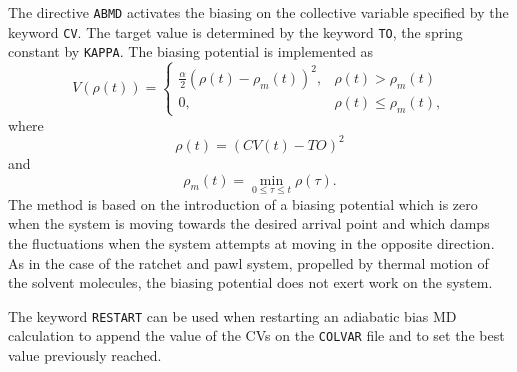 \documentclass[12pt,fleqn]{report}
\newcommand{\keyword}[1]{\index{Keywords!{\tt #1}} {\tt #1}}
\begin{document}
The directive \keyword{ABMD} activates the biasing on the collective
variable specified by the keyword {\tt CV}. The target value is determined by
the keyword {\tt TO}, the spring constant by {\tt KAPPA}. 
The biasing potential is implemented as
\begin{equation}
V(\rho(t)) = \left \{ \begin{array}{ll} \frac{\alpha}{2}\left(\rho(t)-\rho_m(t)\right)^2, &\rho(t)>\rho_m(t)\\
              0, & \rho(t)\le\rho_m(t), \end{array} \right .
\end{equation}
where
\begin{equation}
\rho(t)=\left(CV(t)-TO\right)^2
\end{equation}
and
\begin{equation}
\rho_m(t)=\min_{0\le\tau\le t}\rho(\tau).
\end{equation}
The method is based on the introduction of a biasing potential which is zero when
the system is moving towards the desired arrival point and which damps the
fluctuations when the system attempts at moving in the opposite direction. As in the
case of the ratchet and pawl system, propelled by thermal motion of the solvent
molecules, the biasing potential does not exert work on the system.

The keyword {\tt RESTART} can be used when restarting an adiabatic bias MD
calculation to append the value of the CVs on the {\tt COLVAR} file and
to set the best value previously reached.
\end{document}

